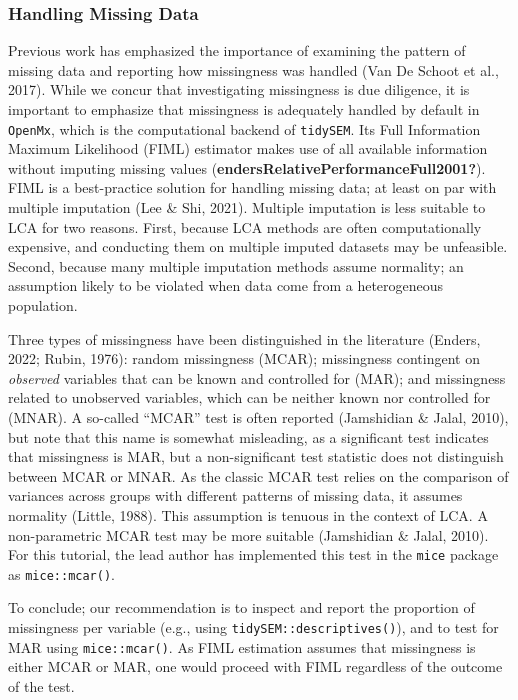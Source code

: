 \documentclass[
  ,man,floatsintext]{apa6}
\begin{document}
\hypertarget{handling-missing-data}{%
\subsubsection{Handling Missing Data}\label{handling-missing-data}}

Previous work has emphasized the importance of examining the pattern of
missing data and reporting how missingness was handled
(Van De Schoot et al., 2017).
While we concur that investigating missingness is due diligence,
it is important to emphasize that missingness is adequately handled by default in \texttt{OpenMx}, which is the computational backend of \texttt{tidySEM}.
Its Full Information Maximum Likelihood (FIML) estimator makes use of all available
information without imputing missing values (\textbf{endersRelativePerformanceFull2001?}).
FIML is a best-practice solution for handling missing data;
at least on par with multiple imputation (Lee \& Shi, 2021).
Multiple imputation is less suitable to LCA for two reasons. First,
because LCA methods are often computationally expensive,
and conducting them on multiple imputed datasets may be unfeasible.
Second, because many multiple imputation methods assume normality; an assumption likely to be violated when data come from a heterogeneous population.

Three types of missingness have
been distinguished in the literature (Enders, 2022; Rubin, 1976): random missingness (MCAR);
missingness contingent on \emph{observed} variables that can be known and controlled for (MAR);
and missingness related to unobserved variables,
which can be neither known nor controlled for (MNAR).
A so-called ``MCAR'' test is often reported (Jamshidian \& Jalal, 2010),
but note that this name is somewhat misleading,
as a significant test indicates that missingness is MAR,
but a non-significant test statistic does not distinguish between MCAR or MNAR.
As the classic MCAR test relies on the comparison of variances across groups with different patterns of missing data, it assumes normality (Little, 1988).
This assumption is tenuous in the context of LCA.
A non-parametric MCAR test may be more suitable (Jamshidian \& Jalal, 2010).
For this tutorial,
the lead author has implemented this test in the \texttt{mice} package as \texttt{mice::mcar()}.

To conclude; our recommendation is to inspect and report the proportion of missingness per variable (e.g., using \texttt{tidySEM::descriptives()}),
and to test for MAR using \texttt{mice::mcar()}.
As FIML estimation assumes that missingness is either MCAR or MAR,
one would proceed with FIML regardless of the outcome of the test.
\end{document}
